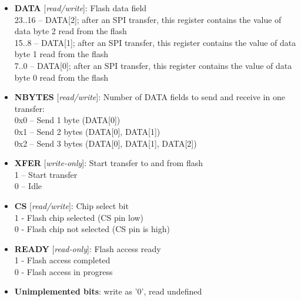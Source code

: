 \begin{itemize}
\item \begin{small}
{\bf 
DATA
} [\emph{read/write}]: Flash data field
\\
23..16 -- DATA[2]; after an SPI transfer, this register contains the value of data byte 2 read from the flash \\      15..8 -- DATA[1]; after an SPI transfer, this register contains the value of data byte 1 read from the flash \\      7..0  -- DATA[0]; after an SPI transfer, this register contains the value of data byte 0 read from the flash
\end{small}
\item \begin{small}
{\bf 
NBYTES
} [\emph{read/write}]: Number of DATA fields to send and receive in one transfer:
\\
 0x0 -- Send 1 byte (DATA[0]) \\      0x1 -- Send 2 bytes (DATA[0], DATA[1]) \\      0x2 -- Send 3 bytes (DATA[0], DATA[1], DATA[2])
\end{small}
\item \begin{small}
{\bf 
XFER
} [\emph{write-only}]: Start transfer to and from flash
\\
1 -- Start transfer \\      0 -- Idle
\end{small}
\item \begin{small}
{\bf 
CS
} [\emph{read/write}]: Chip select bit
\\
1 - Flash chip selected (CS pin low) \\      0 - Flash chip not selected (CS pin is high)
\end{small}
\item \begin{small}
{\bf 
READY
} [\emph{read-only}]: Flash access ready
\\
1 - Flash access completed \\      0 - Flash access in progress
\end{small}
\item \begin{small}
\textbf{Unimplemented bits}: write as '0', read undefined
\end{small}
\end{itemize}




